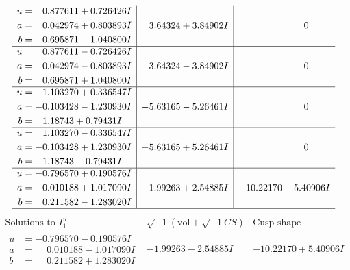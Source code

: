 \documentclass[1p]{elsarticle_modified}
\theoremstyle{definition}
\newcommand{\I}{\sqrt{-1}}
\begin{document}
$$\begin{array}{c|c|c}
\begin{aligned}
u &= \phantom{-}0.877611 + 0.726426 I \\
a &= \phantom{-}0.042974 + 0.803893 I \\
b &= \phantom{-}0.695871 - 1.040800 I\end{aligned}
 & \phantom{-}3.64324 + 3.84902 I & \phantom{-0.000000 } 0 \\ \hline\begin{aligned}
u &= \phantom{-}0.877611 - 0.726426 I \\
a &= \phantom{-}0.042974 - 0.803893 I \\
b &= \phantom{-}0.695871 + 1.040800 I\end{aligned}
 & \phantom{-}3.64324 - 3.84902 I & \phantom{-0.000000 } 0 \\ \hline\begin{aligned}
u &= \phantom{-}1.103270 + 0.336547 I \\
a &= -0.103428 - 1.230930 I \\
b &= \phantom{-}1.18743 + 0.79431 I\end{aligned}
 & -5.63165 - 5.26461 I & \phantom{-0.000000 } 0 \\ \hline\begin{aligned}
u &= \phantom{-}1.103270 - 0.336547 I \\
a &= -0.103428 + 1.230930 I \\
b &= \phantom{-}1.18743 - 0.79431 I\end{aligned}
 & -5.63165 + 5.26461 I & \phantom{-0.000000 } 0 \\ \hline\begin{aligned}
u &= -0.796570 + 0.190576 I \\
a &= \phantom{-}0.010188 + 1.017090 I \\
b &= \phantom{-}0.211582 - 1.283020 I\end{aligned}
 & -1.99263 + 2.54885 I & -10.22170 - 5.40906 I\\
 \hline 
 \end{array}$$\newpage$$\begin{array}{c|c|c}  
\text{Solutions to }I^u_{1}& \I (\text{vol} + \sqrt{-1}CS) & \text{Cusp shape}\\
 \hline 
\begin{aligned}
u &= -0.796570 - 0.190576 I \\
a &= \phantom{-}0.010188 - 1.017090 I \\
b &= \phantom{-}0.211582 + 1.283020 I\end{aligned}
 & -1.99263 - 2.54885 I & -10.22170 + 5.40906 I \\ \hline\begin{aligned}

\end{aligned}
\end{array}$$
\end{document}

